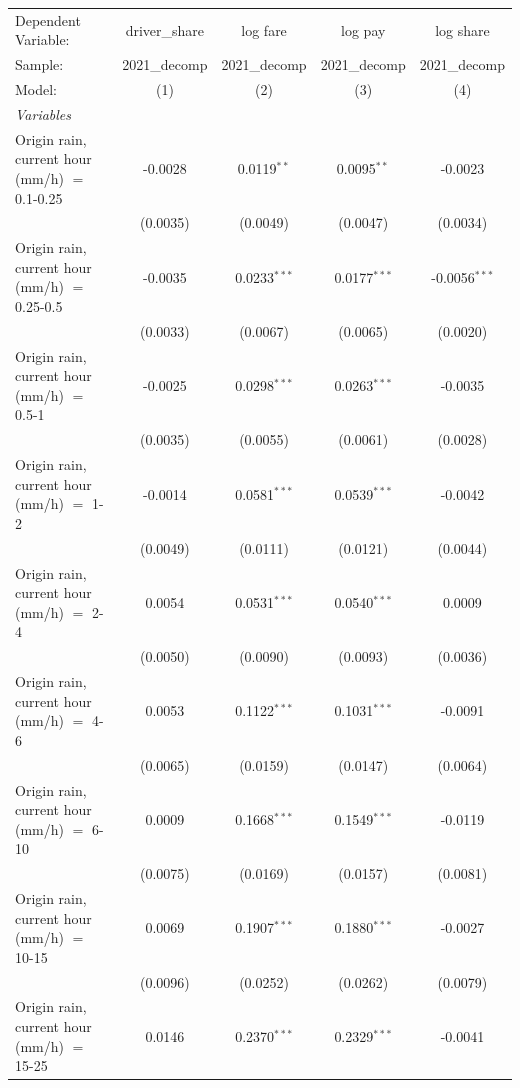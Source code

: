 \ifdefined\ifclassloaded
{}
\fi
\begingroup
\centering
\begin{tabular}{lcccc}
   \tabularnewline \midrule \midrule
   Dependent Variable: & driver\_share & log fare & log pay & log share\\
   Sample: & 2021\_decomp & 2021\_decomp & 2021\_decomp & 2021\_decomp \\
   Model: & (1) & (2) & (3) & (4)\\
   \midrule
   \emph{Variables}\\
   Origin rain, current hour (mm/h) $=$ 0.1-0.25 & -0.0028 & 0.0119$^{**}$ & 0.0095$^{**}$ & -0.0023\\
    & (0.0035) & (0.0049) & (0.0047) & (0.0034)\\
   Origin rain, current hour (mm/h) $=$ 0.25-0.5 & -0.0035 & 0.0233$^{***}$ & 0.0177$^{***}$ & -0.0056$^{***}$\\
    & (0.0033) & (0.0067) & (0.0065) & (0.0020)\\
   Origin rain, current hour (mm/h) $=$ 0.5-1 & -0.0025 & 0.0298$^{***}$ & 0.0263$^{***}$ & -0.0035\\
    & (0.0035) & (0.0055) & (0.0061) & (0.0028)\\
   Origin rain, current hour (mm/h) $=$ 1-2 & -0.0014 & 0.0581$^{***}$ & 0.0539$^{***}$ & -0.0042\\
    & (0.0049) & (0.0111) & (0.0121) & (0.0044)\\
   Origin rain, current hour (mm/h) $=$ 2-4 & 0.0054 & 0.0531$^{***}$ & 0.0540$^{***}$ & 0.0009\\
    & (0.0050) & (0.0090) & (0.0093) & (0.0036)\\
   Origin rain, current hour (mm/h) $=$ 4-6 & 0.0053 & 0.1122$^{***}$ & 0.1031$^{***}$ & -0.0091\\
    & (0.0065) & (0.0159) & (0.0147) & (0.0064)\\
   Origin rain, current hour (mm/h) $=$ 6-10 & 0.0009 & 0.1668$^{***}$ & 0.1549$^{***}$ & -0.0119\\
    & (0.0075) & (0.0169) & (0.0157) & (0.0081)\\
   Origin rain, current hour (mm/h) $=$ 10-15 & 0.0069 & 0.1907$^{***}$ & 0.1880$^{***}$ & -0.0027\\
    & (0.0096) & (0.0252) & (0.0262) & (0.0079)\\
   Origin rain, current hour (mm/h) $=$ 15-25 & 0.0146 & 0.2370$^{***}$ & 0.2329$^{***}$ & -0.0041\\

\end{tabular}

